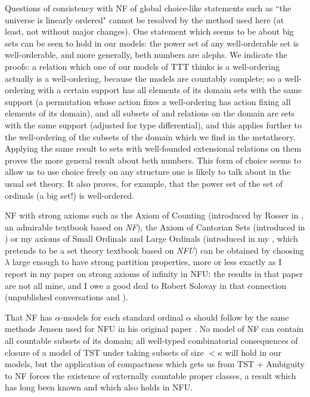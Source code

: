 \documentclass[112pt]{article}
\begin{document}
Questions of consistency with NF of global choice-like statements such as ``the universe is linearly ordered"  cannot be resolved by the method used here (at least, not without major changes).  One statement which seems to be about big sets can be seen to hold in our models:  the power set of any well-orderable set is well-orderable, and more generally, beth numbers are alephs.  We indicate the proofs:  a relation which one of our models of TTT thinks is a well-ordering actually is a well-ordering, because the models are countably complete;  so a well-ordering with a certain support has all elements of its domain sets with the same support (a permutation whose action fixes a well-ordering has action fixing all elements of its domain), and all subsets of and relations on the domain are sets with the same support (adjusted for type differential), and this applies further to the well-ordering of the subsets of the domain which we find in the metatheory.  Applying the same result to sets with well-founded extensional relations on them proves the more general result about beth numbers.  This form of choice seems to allow us to use choice freely on any structure one is likely to talk about in the usual set theory.  It also proves, for example, that the power set of the set of ordinals (a big set!) is well-ordered.

NF with strong axioms such as the Axiom of Counting (introduced by Rosser in \cite{rosser}, an admirable textbook based on {\em NF\/}), the Axiom of Cantorian Sets (introduced in \cite{henson})  or my axioms of Small Ordinals and Large Ordinals (introduced in  my \cite{mybook}, which pretends to be a set theory textbook based on {\em NFU\/}) can be obtained by choosing $\lambda$ large enough to have strong partition properties, more or less exactly as I report in my paper \cite{strongaxioms} on strong axioms of infinity in NFU:  the results in that paper are not all mine, and I owe a good deal to Robert Solovay in that connection (unpublished conversations and \cite{nfub}).

That NF has $\alpha$-models for each standard ordinal $\alpha$ should follow by the same methods Jensen used for NFU in his original paper \cite{nfu}.   No model of NF can contain all countable subsets of its domain;  all well-typed combinatorial consequences
of closure of a model of TST under taking subsets of size $<\kappa$ will hold in our models, but the application of compactness which gets us from TST + Ambiguity to NF forces the existence of externally countable proper classes, a result which has long been known and which also holds in NFU.
\end{document}
